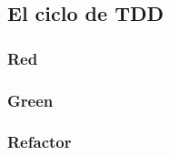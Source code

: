 \subsection{El ciclo de \ac{TDD}}
\label{subsec:tddcycle}



\subsubsection{Red}
\label{sec:tddred}

\subsubsection{Green}
\label{sec:tddgreen}

\subsubsection{Refactor}
\label{sec:tddrefactor}


